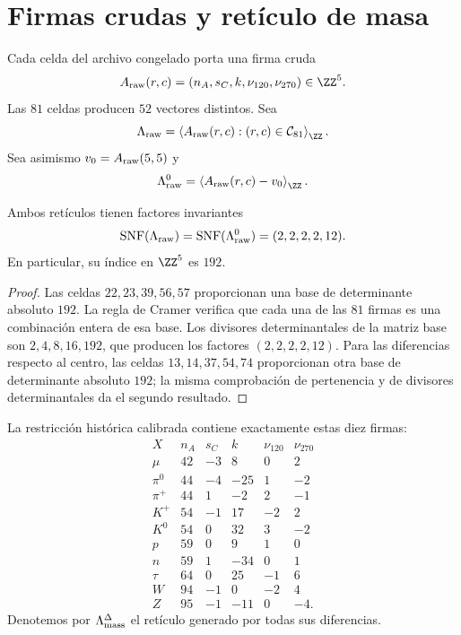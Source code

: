 \section{Firmas crudas y retículo de masa}

Cada celda del archivo congelado porta una firma cruda
\[
 A_{\rm raw}(r,c)=(n_A,s_C,k,\nu_{120},\nu_{270})\in\ZZ^5.
\]
Las \(81\) celdas producen \(52\) vectores distintos. Sea
\[
 \Lambda_{\rm raw}
 =\left\langle A_{\rm raw}(r,c):(r,c)\in\mathcal C_{81}\right\rangle_\ZZ.
\]
Sea asimismo \(v_0=A_{\rm raw}(5,5)\) y
\[
 \Lambda_{\rm raw}^{0}
 =\left\langle A_{\rm raw}(r,c)-v_0\right\rangle_\ZZ.
\]

\begin{theorem}
\label{thm:reticulo-crudo-atlas}
Ambos retículos tienen factores invariantes
\[
 \operatorname{SNF}(\Lambda_{\rm raw})
 =\operatorname{SNF}(\Lambda_{\rm raw}^{0})
 =(2,2,2,2,12).
\]
En particular, su índice en \(\ZZ^5\) es \(192\).
\end{theorem}
\begin{proof}
Las celdas \(22,23,39,56,57\) proporcionan una base de determinante absoluto
\(192\). La regla de Cramer verifica que cada una de las \(81\) firmas es una
combinación entera de esa base. Los divisores determinantales de la matriz
base son \(2,4,8,16,192\), que producen los factores
\((2,2,2,2,12)\). Para las diferencias respecto al centro, las celdas
\(13,14,37,54,74\) proporcionan otra base de determinante absoluto \(192\);
la misma comprobación de pertenencia y de divisores determinantales da el
segundo resultado.
\end{proof}

La restricción histórica calibrada contiene exactamente estas diez firmas:
\[
\begin{array}{c|rrrrr}
X&n_A&s_C&k&\nu_{120}&\nu_{270}\\ \hline
\mu&42&-3&8&0&2\\
\pi^0&44&-4&-25&1&-2\\
\pi^+&44&1&-2&2&-1\\
K^+&54&-1&17&-2&2\\
K^0&54&0&32&3&-2\\
p&59&0&9&1&0\\
n&59&1&-34&0&1\\
\tau&64&0&25&-1&6\\
W&94&-1&0&-2&4\\
Z&95&-1&-11&0&-4.
\end{array}
\]
Denotemos por \(\Lambda_{\rm mass}^{\Delta}\) el retículo generado por todas
sus diferencias.

